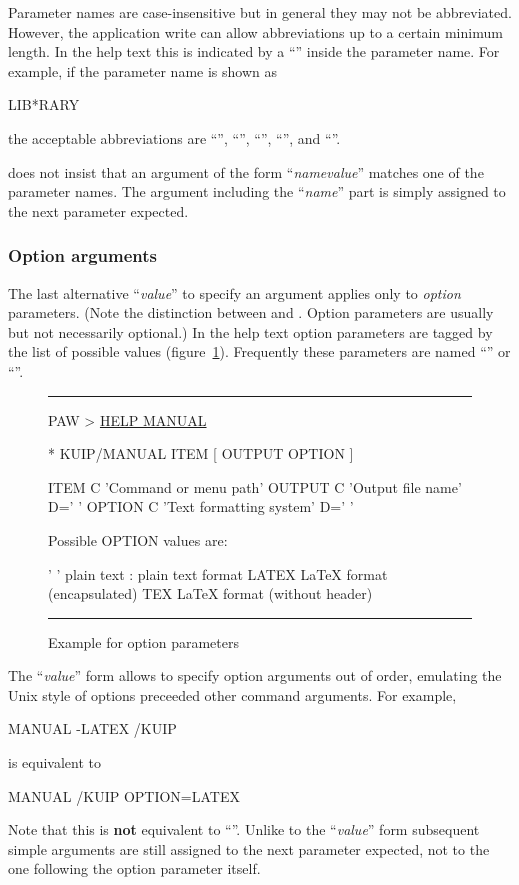 Parameter names are case-insensitive but in general they may not be
abbreviated. 
However, the application write can allow abbreviations up to a certain
minimum length.
In the help text this is indicated by a ``\Lit{*}'' inside the
parameter name.
For example, if the parameter name is shown as
\begin{XMP}
LIB*RARY
\end{XMP}
the acceptable abbreviations are ``'',
``'', ``'', ``'', and
``''.

\KUIP{} does not insist that an argument of the form
``\textsl{name\Lit{=}value}'' matches one of the parameter names. 
The argument including the ``\textsl{name\Lit{=}}'' part is simply
assigned to the next parameter expected.


\subsubsection{Option arguments}

The last alternative ``\Lit{-}\textsl{value}'' to specify an
argument applies only to \textsl{option} parameters.
(Note the distinction between  and .
Option parameters are usually but not necessarily optional.)
In the help text option parameters are tagged by the list of possible
values (figure~\ref{fig-help-manual}).
Frequently these parameters are named ``'' or
``''. 

\begin{figure}[htb]\centering
\hrule
\vspace{.5\baselineskip}
\begin{XMP}
PAW > \underline{HELP MANUAL}

 * KUIP/MANUAL ITEM [ OUTPUT OPTION ]

   ITEM       C 'Command or menu path'
   OUTPUT     C 'Output file name' D=' '
   OPTION     C 'Text formatting system' D=' '

   Possible OPTION values are:

   ' '     plain text : plain text format
    LATEX  LaTeX format (encapsulated)
    TEX    LaTeX format (without header)
\vspace{-1cm}
\end{XMP}
\caption{Example for option parameters
\label{fig-help-manual}}
\hrule
\end{figure}

The ``\Lit{-}\textsl{value}'' form allows to specify option
arguments out of order, emulating the Unix style of options preceeded
other command arguments.
For example,
\begin{XMP}
MANUAL -LATEX /KUIP
\end{XMP}
is equivalent to 
\begin{XMP}
MANUAL /KUIP OPTION=LATEX
\end{XMP}
Note that this is \textbf{not} equivalent to 
``''.
Unlike to the ``\Lit{-}\textsl{value}'' form subsequent simple
arguments are still assigned to the next parameter expected, not to
the one following the option parameter itself.

